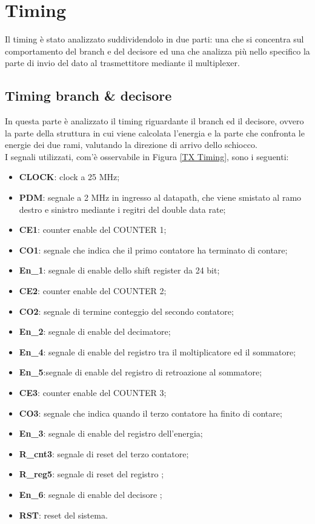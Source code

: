 \documentclass[a4paper, titlepage]{article}
\begin{document}
\section{Timing}
Il timing è stato analizzato suddividendolo in due parti: una che si concentra sul comportamento del branch e del decisore  ed una che analizza più nello specifico la parte di invio del dato al trasmettitore mediante il multiplexer.
\subsection{Timing branch \& decisore}
In questa parte è analizzato il timing riguardante il branch ed il decisore, ovvero la parte della struttura in cui viene calcolata l'energia e la parte che confronta le energie dei due rami, valutando la direzione di arrivo dello schiocco.\\I segnali utilizzati, com'è osservabile in Figura \ref{TX Timing}, sono i seguenti:
\begin{itemize}
    \item \textbf{CLOCK}: clock a 25 MHz; 
    \item \textbf{PDM}: segnale a 2 MHz in ingresso al datapath, che viene smistato al ramo destro e sinistro mediante i regitri del double data rate;
    \item \textbf{CE1}: counter enable del COUNTER 1;
    \item \textbf{CO1}: segnale che indica che il primo contatore ha terminato di contare;
    \item \textbf{En\_1}: segnale di enable dello shift register da 24 bit;
    \item \textbf{CE2}: counter enable del COUNTER 2;
    \item \textbf{CO2}: segnale di termine conteggio del secondo contatore;
    \item \textbf{En\_2}: segnale di enable del decimatore; 
    \item \textbf{En\_4}: segnale di enable del registro tra il moltiplicatore ed il sommatore;
    \item \textbf{En\_5}:segnale di enable del registro di retroazione al sommatore;
    \item \textbf{CE3}: counter enable del COUNTER 3;
    \item \textbf{CO3}: segnale che indica quando il terzo contatore ha finito di contare;
    \item \textbf{En\_3}: segnale di enable del registro dell'energia; 
    \item \textbf{R\_cnt3}: segnale di reset del terzo contatore;
    \item \textbf{R\_reg5}: segnale di reset del registro ;
    \item \textbf{En\_6}: segnale di enable del decisore ;
    \item \textbf{RST}: reset del sistema.
\end{itemize}
\end{document}
